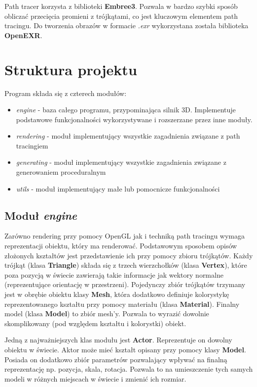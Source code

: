 \documentclass[inz,longabstract]{iithesis}
\begin{document}
        Path tracer korzysta z biblioteki \textbf{Embree3}. Pozwala w bardzo szybki sposób obliczać przecięcia promieni z trójkątami, co jest kluczowym elementem path tracingu. Do tworzenia obrazów w formacie \textit{.exr} wykorzystana została biblioteka \textbf{OpenEXR}.
    \section{Struktura projektu}
        Program składa się z czterech modułów:
        \begin{itemize}
            \item \textit{engine} - baza całego programu, przypominająca silnik 3D. Implementuje podstawowe funkcjonalności wykorzystywane i rozszerzane przez inne moduły. 
            \item \textit{rendering} - moduł implementujący wszystkie zagadnienia związane z path tracingiem
            \item \textit{generating} - moduł implementujący wszystkie zagadnienia związane z generowaniem proceduralnym
            \item \textit{utils} - moduł implementujący małe lub pomocnicze funkcjonalności
        \end{itemize}
        
        \subsection{Moduł \textit{engine}}
            Zarówno rendering przy pomocy OpenGL jak i techniką path tracingu wymaga reprezentacji obiektu, który ma renderować. Podstawowym sposobem opisów złożonych kształtów jest przedstawienie ich przy pomocy zbioru trójkątów. Każdy trójkąt (klasa \textbf{Triangle}) składa się z trzech wierzchołków (klasa \textbf{Vertex}), które poza pozycją w świecie zawierają takie informacje jak wektory normalne (reprezentujące orientację w przestrzeni). Pojedynczy zbiór trójkątów trzymany jest w obrębie obiektu klasy \textbf{Mesh}, która dodatkowo definiuje kolorystykę reprezentowanego kształtu przy pomocy materiału (klasa \textbf{Material}). Finalny model (klasa \textbf{Model}) to zbiór mesh'y. Pozwala to wyrazić dowolnie skomplikowany (pod względem kształtu i kolorystki) obiekt. 
            
            Jedną z najważniejszych klas modułu jest \textbf{Actor}. Reprezentuje on dowolny obiektu w świecie. Aktor może mieć kształt opisany przy pomocy klasy \textbf{Model}. Posiada on dodatkowo zbiór parametrów pozwalający wpływać na finalną reprezentację np. pozycja, skala, rotacja. Pozwala to na umieszczenie tych samych modeli w różnych miejscach w świecie i zmienić ich rozmiar.
            
\end{document}
